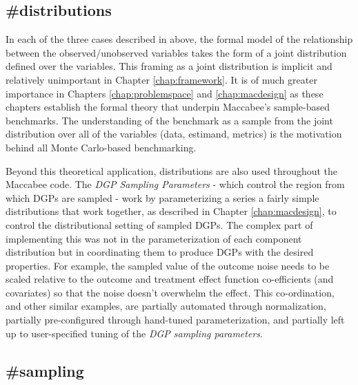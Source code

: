 \documentclass[./main.tex]{subfiles}
\begin{document}

\subsection*{\textbf{\#distributions}}
\label{hc:distributions}

In each of the three cases described in  above, the formal model of the relationship between the observed/unobserved variables takes the form of a joint distribution defined over the variables. This framing as a joint distribution is implicit and relatively unimportant in Chapter \ref{chap:framework}. It is of much greater importance in Chapters \ref{chap:problemspace} and \ref{chap:macdesign} as these chapters establish the formal theory that underpin Maccabee's sample-based benchmarks. The understanding of the benchmark as a sample from the joint distribution over all of the variables (data, estimand, metrics) is the motivation behind all Monte Carlo-based benchmarking.

\vspace{\baselineskip}

Beyond this theoretical application, distributions are also used throughout the Maccabee code. The \textit{DGP Sampling Parameters} - which control the region from which DGPs are sampled - work by parameterizing a series a fairly simple distributions that work together, as described in Chapter \ref{chap:macdesign}, to control the distributional setting of sampled DGPs. The complex part of implementing this was not in the parameterization of each component distribution but in coordinating them to produce DGPs with the desired properties. For example, the sampled value of the outcome noise needs to be scaled relative to the outcome and treatment effect function co-efficients (and covariates) so that the noise doesn't overwhelm the effect. This co-ordination, and other similar examples, are partially automated through normalization, partially pre-configured through hand-tuned parameterization, and partially left up to user-specified tuning of the \textit{DGP sampling parameters}.


\subsection*{\textbf{\#sampling}}
\label{hc:sampling}
\end{document}
